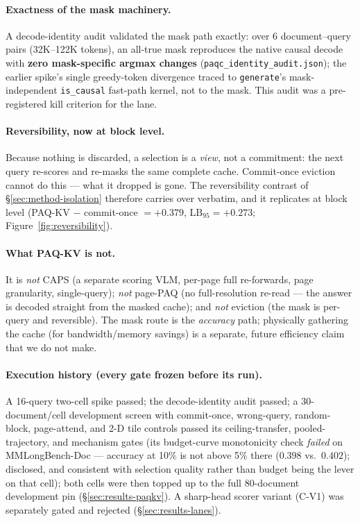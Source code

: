 \documentclass[11pt,letterpaper]{article}
\newcommand{\paq}{\textsc{PAQ}}
\newcommand{\paqc}{\textsc{PAQ-KV}}
\newcommand{\lb}{\mathrm{LB}_{95}}
\begin{document}
\paragraph{Exactness of the mask machinery.} A decode-identity audit validated the mask path
exactly: over 6 document--query pairs (32K--122K tokens), an all-true mask reproduces the
native causal decode with \textbf{zero mask-specific argmax changes}
(\texttt{paqc\_identity\_audit.json}); the earlier spike's single greedy-token divergence
traced to \texttt{generate}'s mask-independent \texttt{is\_causal} fast-path kernel, not to the
mask. This audit was a pre-registered kill criterion for the lane.

\paragraph{Reversibility, now at block level.} Because nothing is discarded, a selection is a
\emph{view}, not a commitment: the next query re-scores and re-masks the same complete cache.
Commit-once eviction cannot do this --- what it dropped is gone. The reversibility contrast of
\S\ref{sec:method-isolation} therefore carries over verbatim, and it replicates at block level
(\paqc{} $-$ commit-once $= +0.379$, $\lb=+0.273$; Figure~\ref{fig:reversibility}).

\paragraph{What \paqc{} is not.} It is \emph{not} CAPS (a separate scoring VLM, per-page full
re-forwards, page granularity, single-query); \emph{not} page-\paq{} (no full-resolution
re-read --- the answer is decoded straight from the masked cache); and \emph{not} eviction (the
mask is per-query and reversible). The mask route is the \emph{accuracy} path; physically
gathering the cache (for bandwidth/memory savings) is a separate, future efficiency claim that
we do not make.

\paragraph{Execution history (every gate frozen before its run).} A 16-query two-cell spike
passed; the decode-identity audit passed; a 30-document/cell development screen with
commit-once, wrong-query, random-block, page-attend, and 2-D tile controls passed its
ceiling-transfer, pooled-trajectory, and mechanism gates (its budget-curve monotonicity check
\emph{failed} on MMLongBench-Doc --- accuracy at 10\% is not above 5\% there ($0.398$ vs.\
$0.402$); disclosed, and consistent with selection quality rather than budget being the lever
on that cell); both cells were then topped up to the full 80-document development pin
(\S\ref{sec:results-paqkv}). A sharp-head scorer variant (C-V1) was separately gated and
rejected (\S\ref{sec:results-lanes}).
\end{document}
